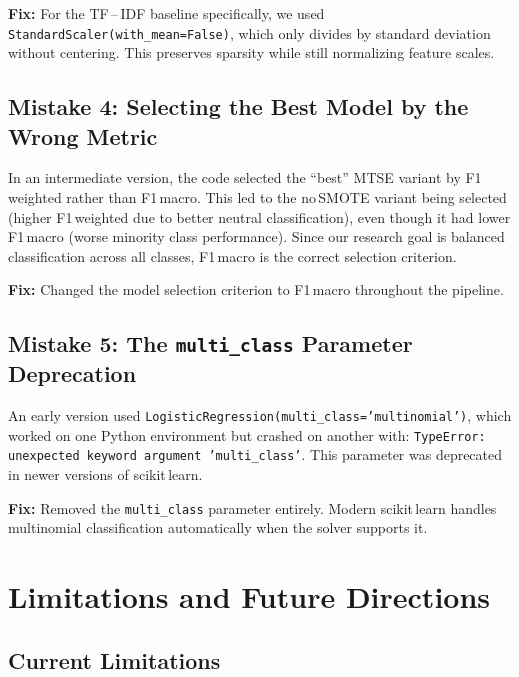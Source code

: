 \documentclass[12pt,a4paper,twoside]{article}
\theoremstyle{definition}
\begin{document}
\textbf{Fix:} For the TF\,--\,IDF baseline specifically, we used \texttt{StandardScaler(with\_mean=False)}, which only divides by standard deviation without centering. This preserves sparsity while still normalizing feature scales.

\subsection{Mistake 4: Selecting the Best Model by the Wrong Metric}

In an intermediate version, the code selected the ``best'' MTSE variant by F1\,weighted rather than F1\,macro. This led to the no\,SMOTE variant being selected (higher F1\,weighted due to better neutral classification), even though it had lower F1\,macro (worse minority class performance). Since our research goal is balanced classification across all classes, F1\,macro is the correct selection criterion.

\textbf{Fix:} Changed the model selection criterion to F1\,macro throughout the pipeline.

\subsection{Mistake 5: The \texttt{multi\_class} Parameter Deprecation}

An early version used \texttt{LogisticRegression(multi\_class='multinomial')}, which worked on one Python environment but crashed on another with: \texttt{TypeError: unexpected keyword argument 'multi\_class'}. This parameter was deprecated in newer versions of scikit\,learn.

\textbf{Fix:} Removed the \texttt{multi\_class} parameter entirely. Modern scikit\,learn handles multinomial classification automatically when the solver supports it.

\section{Limitations and Future Directions}
\label{sec:limitations}

\subsection{Current Limitations}
\end{document}
